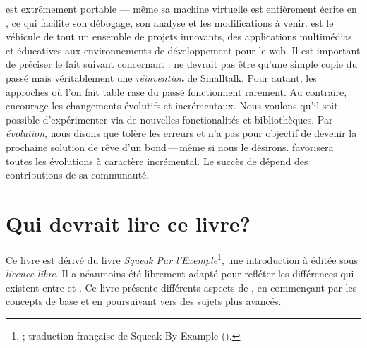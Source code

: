 \documentclass[a4paper,10pt,twoside]{book}
\begin{document}
\pharo est extrêmement portable --- même sa machine virtuelle est
entièrement écrite en \st, ce qui facilite son débogage, son
analyse et les modifications à venir. \pharo est le véhicule de tout
un ensemble de projets innovants, des applications multimédias et
éducatives aux environnements de développement pour le web.
Il est important de préciser le fait suivant concernant \pharo: 
\pharo ne devrait pas être qu'une simple copie du passé mais véritablement
une \emph{réinvention} de Smalltalk. Pour autant, les approches où l'on fait table rase du passé fonctionnent rarement.
Au contraire, \pharo encourage les changements évolutifs et
incrémentaux. Nous voulons qu'il soit possible d'expérimenter via de nouvelles fonctionalités et bibliothèques. Par \emph{évolution},
nous disons que \pharo tolère les erreurs et n'a pas pour objectif
de devenir la prochaine solution de rêve d'un bond\,---\,même si nous
le désirons.
\pharo favorisera toutes les évolutions à caractère incrémental. 
Le succès de \pharo dépend des contributions de sa communauté.

\section*{Qui devrait lire ce livre?}

Ce livre est dérivé du livre \emph{Squeak Par l'Exemple}\footnote{\spe;
  traduction française de Squeak By Example \mbox{(\sbe).}}, une introduction
à \squeak éditée sous \emph{licence libre}. Il a néanmoins été librement
adapté pour refléter les différences qui existent entre \pharo et \squeak. Ce livre 
présente différents aspects de \pharo, en commençant par les concepts 
de base et en poursuivant vers des sujets plus avancés.
\end{document}
